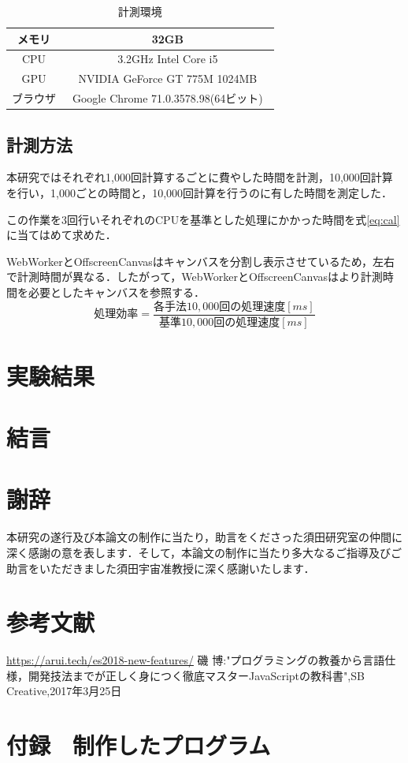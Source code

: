 \documentclass[a4j,12pt]{jsarticle}
\begin{document}
\begin{table} [h]
\centering
\caption{計測環境}
	\begin{tabular} {| c | c |} \hline
	メモリ & 32GB \\ \hline
	CPU & 3.2GHz Intel Core i5 \\ \hline
	GPU & NVIDIA GeForce GT 775M 1024MB\\ \hline
	ブラウザ & Google Chrome 71.0.3578.98(64ビット)　\\ \hline
	\end{tabular} 
	\label{tab:tab1}
\end{table}

\subsection{計測方法}
本研究ではそれぞれ1,000回計算するごとに費やした時間を計測，10,000回計算を行い，1,000ごとの時間と，10,000回計算を行うのに有した時間を測定した．

この作業を3回行いそれぞれのCPUを基準とした処理にかかった時間を式\ref{eq:cal}に当てはめて求めた．

WebWorkerとOffscreenCanvasはキャンバスを分割し表示させているため，左右で計測時間が異なる．したがって，WebWorkerとOffscreenCanvasはより計測時間を必要としたキャンバスを参照する．
\begin{equation}
 処理効率 = \frac { 各手法10,000回の処理速度 [ms]} { 基準10,000回の処理速度[ms] } 
\label{eq:cal}
\end{equation}

\newpage

\section{実験結果}
\newpage

\section{結言}
\newpage

\section{謝辞}
本研究の遂行及び本論文の制作に当たり，助言をくださった須田研究室の仲間に深く感謝の意を表します．そして，本論文の制作に当たり多大なるご指導及びご助言をいただきました須田宇宙准教授に深く感謝いたします．
\newpage

\section{参考文献}
\begin{thebibliography}{99}
\url{https://arui.tech/es2018-new-features/}
磯 博:"プログラミングの教養から言語仕様，開発技法までが正しく身につく徹底マスターJavaScriptの教科書",SB Creative,2017年3月25日
\end{thebibliography}
\newpage

\section{付録　制作したプログラム}
\end{document}
